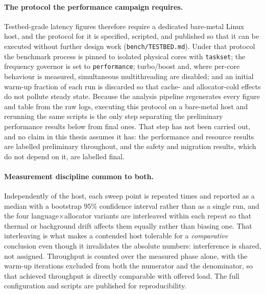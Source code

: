 \documentclass[english,twoside,openright,a4paper,censored,csm,software-track-2020]{HYthesisML}
\begin{document}
\paragraph{The protocol the performance campaign requires.}
Testbed-grade latency figures therefore require a dedicated bare-metal Linux host, and the
protocol for it is specified, scripted, and published so that it can be executed without
further design work (\texttt{bench/TESTBED.md}). Under that protocol the benchmark process is
pinned to isolated physical cores with \texttt{taskset}; the frequency governor is set to
\texttt{performance}; turbo/boost and, where per-core behaviour is measured, simultaneous
multithreading are disabled; and an initial warm-up fraction of each run is discarded so that
cache- and allocator-cold effects do not pollute steady state. Because the analysis pipeline
regenerates every figure and table from the raw logs, executing this protocol on a bare-metal
host and rerunning the same scripts is the only step separating the preliminary performance
results below from final ones. That step has not been carried out, and no claim in this
thesis assumes it has: the performance and resource results are labelled preliminary
throughout, and the safety and migration results, which do not depend on it, are labelled
final.

\paragraph{Measurement discipline common to both.}
Independently of the host, each sweep point is repeated \NRepeats{} times and reported as a
median with a bootstrap $95\%$ confidence interval rather than as a single run, and the four
language$\times$allocator variants are interleaved within each repeat so that thermal or
background drift affects them equally rather than biasing one. That interleaving is what makes
a contended host tolerable for a \emph{comparative} conclusion even though it invalidates the
absolute numbers: interference is shared, not assigned. Throughput is counted over the measured
phase alone, with the warm-up iterations excluded from both the numerator and the denominator,
so that achieved throughput is directly comparable with offered load. The full configuration
and scripts are published for reproducibility.
\end{document}
